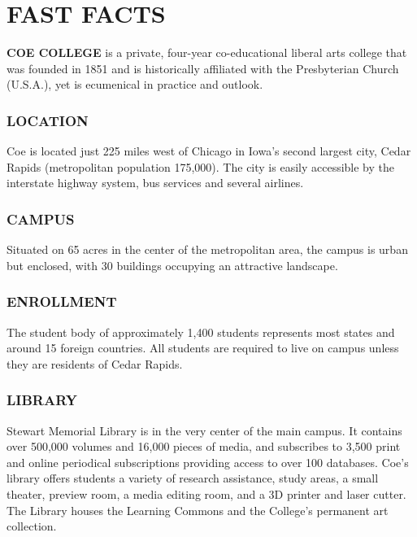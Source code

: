 \documentclass[
  letterpaper,
]{scrbook}
\begin{document}
\hypertarget{fast-facts}{%
\chapter*{FAST FACTS}\label{fast-facts}}


\textbf{COE COLLEGE} is a private, four-year co-educational liberal arts
college that was founded in 1851 and is historically affiliated with the
Presbyterian Church (U.S.A.), yet is ecumenical in practice and outlook.

\hypertarget{location}{%
\subsection*{LOCATION}\label{location}}

Coe is located just 225 miles west of Chicago in Iowa's second largest
city, Cedar Rapids (metropolitan population 175,000). The city is easily
accessible by the interstate highway system, bus services and several
airlines.

\hypertarget{campus}{%
\subsection*{CAMPUS}\label{campus}}

Situated on 65 acres in the center of the metropolitan area, the campus
is urban but enclosed, with 30 buildings occupying an attractive
landscape.

\hypertarget{enrollment}{%
\subsection*{ENROLLMENT}\label{enrollment}}

The student body of approximately 1,400 students represents most states
and around 15 foreign countries. All students are required to live on
campus unless they are residents of Cedar Rapids.

\hypertarget{library}{%
\subsection*{LIBRARY}\label{library}}

Stewart Memorial Library is in the very center of the main campus. It
contains over 500,000 volumes and 16,000 pieces of media, and subscribes
to 3,500 print and online periodical subscriptions providing access to
over 100 databases. Coe's library offers students a variety of research
assistance, study areas, a small theater, preview room, a media editing
room, and a 3D printer and laser cutter. The Library houses the Learning
Commons and the College's permanent art collection.
\end{document}
